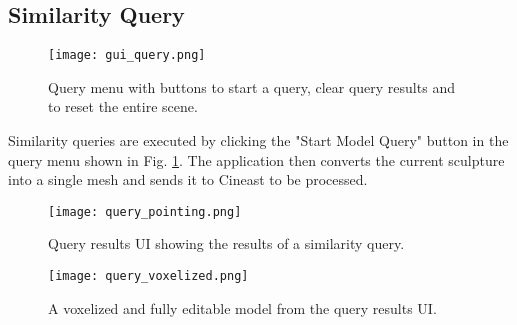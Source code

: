 \subsection{Similarity Query}

\begin{figure}
\centering
\captionsetup{width=0.8\textwidth}
\texttt{[image: gui\_query.png]}
\caption{Query menu with buttons to start a query, clear query results and to reset the entire scene.}
\label{fig:gui_query}
\end{figure}

Similarity queries are executed by clicking the "Start Model Query" button in the query menu shown in Fig. \ref{fig:gui_query}. The application then converts the current sculpture into a single mesh and sends it to Cineast to be processed.



\begin{figure}[!htb]
\texttt{[image: query\_pointing.png]}
\caption{Query results UI showing the results of a similarity query.}
\label{fig:query_pointing}
\endminipage\hfill
{}
\texttt{[image: query\_voxelized.png]}
\caption{A voxelized and fully editable model from the query results UI.}
\label{fig:query_voxelized}
\endminipage\hfill
\end{figure}

